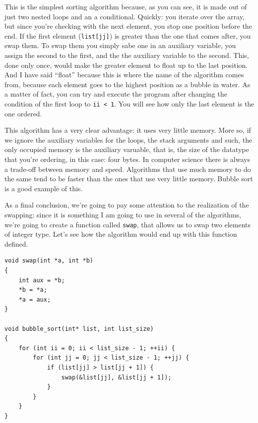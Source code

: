 \documentclass[a4paper]{article}
\begin{document}
This is the simplest sorting algorithm because, as you can see, it is made out
of just two nested loops and an a conditional. Quickly: you iterate over the
array, but since you're checking with the next element, you stop one position
before the end. If the first element (\verb!list[jj]!) is greater than the one
that comes after, you swap them. To swap them you simply sabe one in an
auxiliary variable, you assign the second to the first, and the the auxiliary
variable to the second. This, done only once, would make the greater element to
float up to the last position. And I have said ``float'' because this is where
the name of the algorithm comes from, because each element goes to the highest
position as a bubble in water. As a matter of fact, you can try and execute
the program after changing the condition of the first loop to \verb!ii < 1!.
You will see how only the last element is the one ordered.

This algorithm has a very clear advantage: it uses very little memory. More so,
if we ignore the auxiliary variables for the loops, the stack arguments and
such, the only occupied memory is the auxiliary varuable, that is, the size
of the datatype that you're ordering, in this case: four bytes. In computer
science there is always a trade-off between memory and speed. Algorithms that
use much memory to do the same tend to be faster than the ones that use very
little memory. Bubble sort is a good example of this.

As a final conclusion, we're going to pay some attention to the realization of
the swapping: since it is something I am going to use in several of the
algorithms, we're going to create a function called \verb!swap!, that allows us
to swap two elements of integer type. Let's see how the algorithm would end up
with this function defined.

\noindent
\begin{minipage}[H]{\linewidth}
\mbox{}
\begin{lstlisting}[style=C,
caption={Implementation of \texttt{swap} and use in bubble sort},
label={lst:bubbleSwap}]
void swap(int *a, int *b)
{
    int aux = *b;
    *b = *a;
    *a = aux;
}

void bubble_sort(int* list, int list_size)
{
    for (int ii = 0; ii < list_size - 1; ++ii) {
        for (int jj = 0; jj < list_size - 1; ++jj) {
            if (list[jj] > list[jj + 1]) {
                swap(&list[jj], &list[jj + 1]);
            }
        }
    }
}
\end{lstlisting}
\end{minipage}
\end{document}
